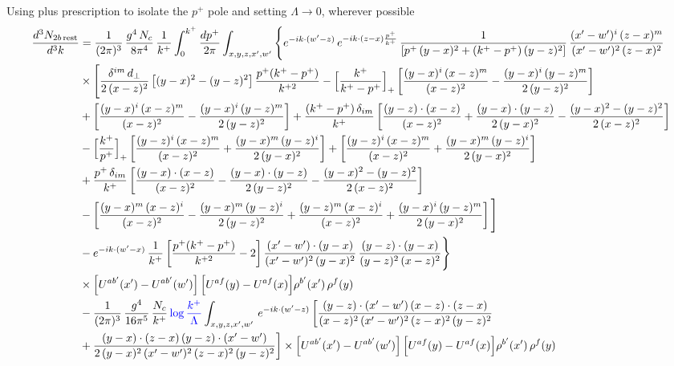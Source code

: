 \documentclass[9pt]{article}
\numberwithin{equation}{section}
\begin{document}
Using plus prescription to isolate the $p^{+}$ pole and setting $\Lambda\to 0$, wherever possible
\begin{align}
\frac{d^{3}N_{2b\,\rm rest}}{d^{3}k} & =\frac{1}{(2\pi)^{3}}\,\frac{g^{4}\,N_{c}}{8\pi^{4}}\,\frac{1}{k^{+}}\int_{0}^{k^{+}}\frac{dp^{+}}{2\pi}\int_{x,y,z,x',w'}\Bigg\{e^{-ik\cdot(w'-z)}\,e^{-ik\cdot(z-x)\frac{p^{+}}{k^{+}}}\,\frac{1}{\left[p^{+}\,(y-x)^{2}+(k^{+}-p^{+})\,(y-z)^{2}\right]}\,\frac{(x'-w')^{i}\,(z-x)^{m}}{(x'-w')^{2}\,(z-x)^{2}}\notag\\
&\times\Bigg[\frac{\delta^{im}\,d_{\perp}}{2\,(x-z)^{2}}\left[(y-x)^{2}-(y-z)^{2}\right]\frac{p^{+}(k^{+}-p^{+})}{k^{+2}}
-\Big[\frac{k^{+}}{k^{+}-p^{+}}\Big]_{+}\left[\frac{(y-x)^{i}\,(x-z)^{m}}{(x-z)^{2}}-\frac{(y-x)^{i}\,(y-z)^{m}}{2\,(y-z)^{2}}\right]\notag\\
&+\left[\frac{(y-x)^{i}\,(x-z)^{m}}{(x-z)^{2}}-\frac{(y-x)^{i}\,(y-z)^{m}}{2\,(y-z)^{2}}\right]
+\frac{(k^{+}-p^{+})\,\delta_{im}}{k^{+}}\left[\frac{(y-z)\cdot(x-z)}{(x-z)^{2}}+\frac{(y-x)\cdot(y-z)}{2\,(y-x)^{2}}-\frac{(y-x)^{2}-(y-z)^{2}}{2\,(x-z)^{2}}\right]\notag\\
&-\Big[\frac{k^{+}}{p^{+}}\Big]_{+}\left[\frac{(y-z)^{i}\,(x-z)^{m}}{(x-z)^{2}}+\frac{(y-x)^{m}\,(y-z)^{i}}{2\,(y-x)^{2}}\right]+\left[\frac{(y-z)^{i}\,(x-z)^{m}}{(x-z)^{2}}+\frac{(y-x)^{m}\,(y-z)^{i}}{2\,(y-x)^{2}}\right]\notag\\
&+\frac{p^{+}\,\delta_{im}}{k^{+}}\left[\frac{(y-x)\cdot(x-z)}{(x-z)^{2}}-\frac{(y-x)\cdot(y-z)}{2\,(y-z)^{2}}-\frac{(y-x)^{2}-(y-z)^{2}}{2\,(x-z)^{2}}\right]\notag\\
&-\left[\frac{(y-x)^{m}\,(x-z)^{i}}{(x-z)^{2}}-\frac{(y-x)^{m}\,(y-z)^{i}}{2\,(y-z)^{2}}+\frac{(y-z)^{m}\,(x-z)^{i}}{(x-z)^{2}}+\frac{(y-x)^{i}\,(y-z)^{m}}{2\,(y-x)^{2}}\right]\Bigg]\notag\\
&-e^{-ik\cdot(w'-x)}\,\frac{1}{k^{+}}\left[\frac{p^{+}(k^{+}-p^{+})}{k^{+2}}-2\right]\frac{(x'-w')\cdot(y-x)}{(x'-w')^{2}\,(y-x)^{2}}\,\frac{(y-z)\cdot(y-x)}{(y-z)^{2}\,(x-z)^{2}}\Bigg\}\notag\\
&\times\Big[U^{ab'}(x')-U^{ab'}(w')\Big]\,\Big[U^{af}(y)-U^{af}(x)\Big]\rho^{b'}(x')\,\rho^{f}(y)\notag \\ & -\frac{1}{(2\pi)^{3}}\,\frac{g^{4}}{16\pi^{5}}\,\frac{N_{c}}{k^{+}}\,{\color{blue}\log\frac{k^{+}}{\Lambda}}\int_{x,y,z,x',w'}\,e^{-ik\cdot(w'-z)}\,\bigg[\frac{(y-z)\cdot (x'-w')\,(x-z)\cdot (z-x)}{(x-z)^{2}\,(x'-w')^{2}\,(z-x)^{2}\,(y-z)^{2}}\notag \\ & +\frac{(y-x)\cdot (z-x)\,(y-z)\cdot (x'-w')}{2\,(y-x)^{2}\,(x'-w')^{2}\,(z-x)^{2}\,(y-z)^{2}}\bigg]\times\Big[U^{ab'}(x')-U^{ab'}(w')\Big]\,\Big[U^{af}(y)-U^{af}(x)\Big]\rho^{b'}(x')\,\rho^{f}(y)\notag\\

\end{align}
\end{document}
